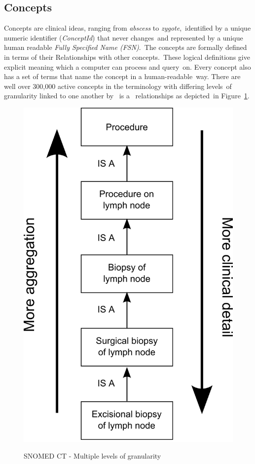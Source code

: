 \documentclass[DIV=calc, paper=a4, fontsize=12pt, onecolumn]{scrartcl}	 %
\begin{document}
  \subsection{Concepts}
  Concepts are clinical ideas, ranging from \emph{abscess} to \emph{zygote},\
  identified by a unique numeric identifier (\textit{ConceptId}) that never changes\
  and represented by a unique human readable \textit{Fully Specified Name (FSN)}.\
  The concepts are formally defined in terms of their Relationships with other concepts.\
  These logical definitions give explicit meaning which a computer can process and query\
  on. Every concept also has a set of terms that name the concept in a human-readable\
  way. There are well over 300,000 active concepts in the terminology with differing levels\
  of granularity linked to one another by \textbar ~is a \textbar ~relationships as depicted\
  in Figure~\ref{fig:snomedct_concepts_granularity}.\\
  \begin{figure}[!ht]
    \centering
    \includegraphics[scale=1]{granularity.png}
    \caption{SNOMED CT - Multiple levels of granularity}\cite[Fig.~1]{snomed_-_user_guide_snomed_2011}
    \label{fig:snomedct_concepts_granularity}
  \end{figure}
\end{document}

